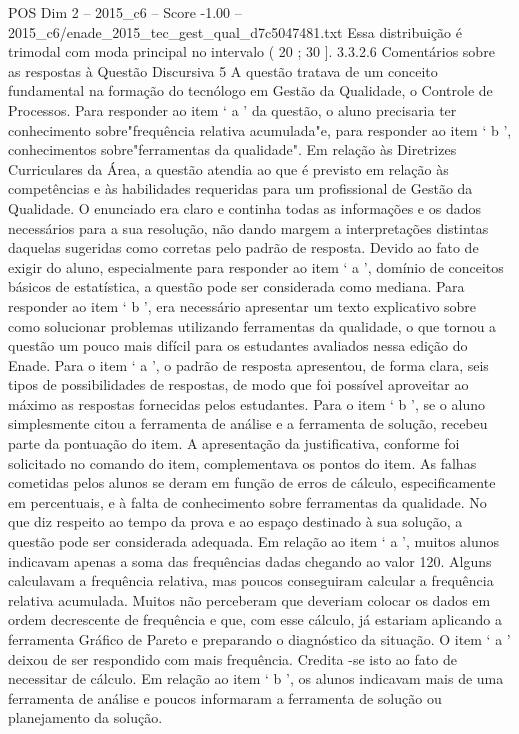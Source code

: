 \begin{textsample}{POS Dim 2 – 2015\_c6 – Score -1.00 – 2015\_c6/enade\_2015\_tec\_gest\_qual\_d7c5047481.txt}
Essa distribuição é trimodal com moda principal no intervalo ( 20 ; 30 ]. 3.3.2.6 Comentários sobre as respostas à Questão Discursiva 5 A questão tratava de um conceito fundamental na formação do tecnólogo em Gestão da Qualidade, o Controle de Processos.
Para responder ao item ‘ a ’ da questão, o aluno precisaria ter conhecimento sobre"frequência relativa acumulada"e, para responder ao item ‘ b ’, conhecimentos sobre"ferramentas da qualidade".
Em relação às Diretrizes Curriculares da Área, a questão atendia ao que é previsto em relação às competências e às habilidades requeridas para um profissional de Gestão da Qualidade.
O enunciado era claro e continha todas as informações e os dados necessários para a sua resolução, não dando margem a interpretações distintas daquelas sugeridas como corretas pelo padrão de resposta.
Devido ao fato de exigir do aluno, especialmente para responder ao item ‘ a ’, domínio de conceitos básicos de estatística, a questão pode ser considerada como mediana.
Para responder ao item ‘ b ’, era necessário apresentar um texto explicativo sobre como solucionar problemas utilizando ferramentas da qualidade, o que tornou a questão um pouco mais difícil para os estudantes avaliados nessa edição do Enade.
Para o item ‘ a ’, o padrão de resposta apresentou, de forma clara, seis tipos de possibilidades de respostas, de modo que foi possível aproveitar ao máximo as respostas fornecidas pelos estudantes.
Para o item ‘ b ’, se o aluno simplesmente citou a ferramenta de análise e a ferramenta de solução, recebeu parte da pontuação do item.
A apresentação da justificativa, conforme foi solicitado no comando do item, complementava os pontos do item.
As falhas cometidas pelos alunos se deram em função de erros de cálculo, especificamente em percentuais, e à falta de conhecimento sobre ferramentas da qualidade.
No que diz respeito ao tempo da prova e ao espaço destinado à sua solução, a questão pode ser considerada adequada.
Em relação ao item ‘ a ’, muitos alunos indicavam apenas a soma das frequências dadas chegando ao valor 120.
Alguns calculavam a frequência relativa, mas poucos conseguiram calcular a frequência relativa acumulada.
Muitos não perceberam que deveriam colocar os dados em ordem decrescente de frequência e que, com esse cálculo, já estariam aplicando a ferramenta Gráfico de Pareto e preparando o diagnóstico da situação.
O item ‘ a ’ deixou de ser respondido com mais frequência.
Credita -se isto ao fato de necessitar de cálculo.
Em relação ao item ‘ b ’, os alunos indicavam mais de uma ferramenta de análise e poucos informaram a ferramenta de solução ou planejamento da solução.

\end{textsample}
